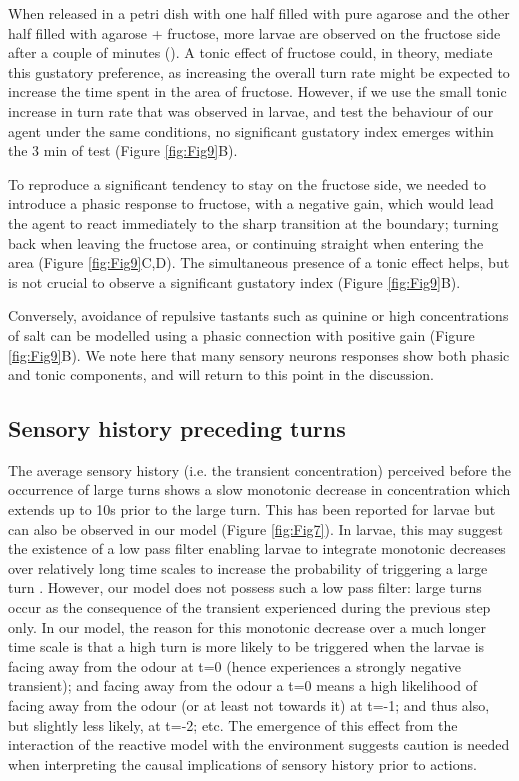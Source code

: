 \documentclass[10pt,a4paper]{article}
\begin{document}
When released in a petri dish with one half filled with pure agarose and the other half filled with agarose + fructose, more larvae are observed on the fructose side after a couple of minutes (\citep{schleyer2011behavior}). A tonic effect of fructose could, in theory, mediate this gustatory preference, as increasing the overall turn rate might be expected to increase the time spent in the area of fructose. However, if we use the small tonic increase in turn rate that was observed in larvae, and test the behaviour of our agent under the same conditions, no significant gustatory index emerges within the 3 min of test (Figure \ref{fig:Fig9}B).

 To reproduce a significant tendency to stay on the fructose side, we needed to introduce a phasic response to fructose, with a negative gain, which would lead the agent to react immediately to the sharp transition at the boundary; turning back when leaving the fructose area, or continuing straight when entering the area (Figure \ref{fig:Fig9}C,D). The simultaneous presence of a tonic effect helps, but is not crucial to observe a significant gustatory index (Figure \ref{fig:Fig9}B).

  Conversely, avoidance of repulsive tastants such as quinine or high concentrations of salt \citep{schleyer2011behavior} can be modelled using a phasic connection with positive gain (Figure \ref{fig:Fig9}B). We note here that many sensory neurons responses show both phasic and tonic components, and will return to this point in the discussion.

\subsection{Sensory history preceding turns}
The average sensory history (i.e. the transient concentration) perceived before the occurrence of large turns shows a slow monotonic decrease in concentration which extends up to 10s prior to the large turn. This has been reported for larvae  \citep{gomez2011active} but can also be observed in our model (Figure \ref{fig:Fig7}). In larvae, this may suggest the existence of a low pass filter enabling larvae to integrate monotonic decreases over relatively long time scales to increase the probability of triggering a large turn \citep{gomez2011active,davies2015model}. However, our model does not possess such a low pass filter: large turns occur as the consequence of the transient experienced during the previous step only. In our model, the reason for this monotonic decrease over a much longer time scale is that a high turn is more likely to be triggered when the larvae is facing away from the odour at t=0 (hence experiences a strongly negative transient); and facing away from the odour a t=0 means a high likelihood of facing away from the odour (or at least not towards it) at t=-1; and thus also, but slightly less likely, at t=-2; etc. The emergence of this effect from the interaction of the reactive model with the environment suggests caution is needed when interpreting the causal implications of sensory history prior to actions.
\end{document}
